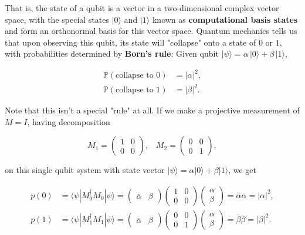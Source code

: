 \documentclass{article}
\theoremstyle{definition}
\begin{document}
    That is, the state of a qubit is a vector in a two-dimensional complex vector space, with the special states $|0\rangle$ and $|1\rangle$ known as \textbf{computational basis states} and form an orthonormal basis for this vector space. Quantum mechanics tells us that upon observing this qubit, its state will "collapse" onto a state of $0$ or $1$, with probabilities determined by \textbf{Born's rule}: Given qubit $|\psi \rangle = \alpha \,|0 \rangle + \beta \, | 1\rangle$,

    \begin{align*}
      \mathbb{P}(\text{collapse to } 0) & = |\alpha|^2, \\
      \mathbb{P}(\text{collapse to } 1) & = |\beta|^2.
    \end{align*}

    Note that this isn't a special "rule" at all. If we make a projective measurement of $M = I$, having decomposition

      \[M_1 = \begin{pmatrix} 1 & 0 \\ 0 & 0 \end{pmatrix}, \;\;\; M_2 = \begin{pmatrix} 0 & 0 \\ 0 & 1 \end{pmatrix},\]

    on this single qubit system with state vector $|\psi \rangle = \alpha |0\rangle + \beta |1 \rangle$, we get

    \begin{align*}
      p(0) & = \langle \psi | M_0^\dagger M_0 | \psi \rangle = \begin{pmatrix} \overline{\alpha} & \overline{\beta} \end{pmatrix} \begin{pmatrix} 1 & 0 \\ 0&0 \end{pmatrix} \begin{pmatrix} \alpha \\ \beta \end{pmatrix} = \overline{\alpha} \alpha = |\alpha|^2, \\
      p(1) & = \langle \psi | M_1^\dagger M_1 | \psi \rangle = \begin{pmatrix} \overline{\alpha} & \overline{\beta} \end{pmatrix} \begin{pmatrix} 0 & 0 \\ 0&1 \end{pmatrix} \begin{pmatrix} \alpha \\ \beta \end{pmatrix} = \overline{\beta} \beta = |\beta|^2.
    \end{align*}
\end{document}
